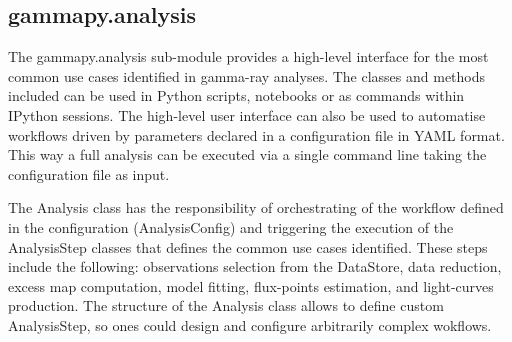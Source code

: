 \subsection{gammapy.analysis}
\label{ssec:gammapy-analysis}

The gammapy.analysis sub-module provides a  high-level interface for the most
common use cases identified in gamma-ray analyses. The classes and methods
included can be used in Python scripts, notebooks or as commands within IPython
sessions. The high-level user interface can also be used to automatise
workflows driven by parameters declared in a configuration file in YAML format.
This way a full analysis can be executed via a single command line taking the
configuration file as input.

The Analysis class has the responsibility of orchestrating of the workflow
defined in the configuration (AnalysisConfig) and triggering the execution of
the AnalysisStep classes that defines the common use cases identified. These
steps include the following: observations selection from the DataStore,  data
reduction, excess map computation, model fitting, flux-points estimation, and
light-curves production. The structure of the Analysis class allows to define
custom AnalysisStep,  so ones could design and configure arbitrarily complex
wokflows.

